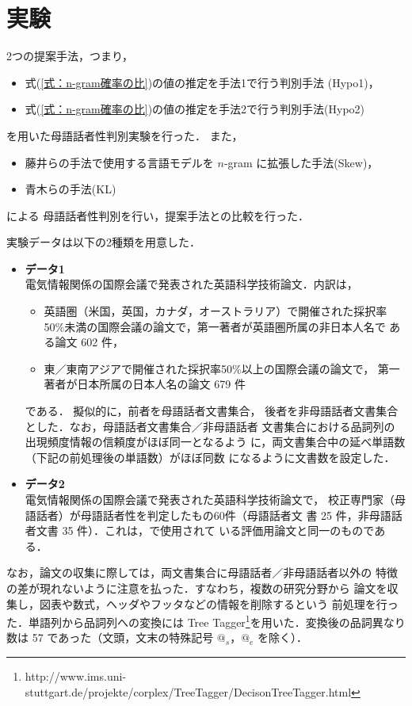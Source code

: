 \documentclass[japanese]{jnlp_1.4}
\begin{document}
\section{実験}

2つの提案手法，つまり，
\begin{itemize}
\item 式(\ref{式：n-gram確率の比})の値の推定を手法1で行う判別手法
	   (Hypo1)，
\item 式(\ref{式：n-gram確率の比})の値の推定を手法2で行う判別手法(Hypo2)
\end{itemize}
を用いた母語話者性判別実験を行った．
また，
\begin{itemize}
\item 藤井らの手法で使用する言語モデルを $n$-gram に拡張した手法(Skew)，
\item 青木らの手法(KL)
\end{itemize}
による
母語話者性判別を行い，提案手法との比較を行った．

実験データは以下の2種類を用意した．
\begin{itemize}
 \item {\bf データ1}\\
       電気情報関係の国際会議で発表された英語科学技術論文．内訳は，
       \begin{itemize}
	\item 英語圏（米国，英国，カナダ，オーストラリア）で開催された採択率
	      50\%未満の国際会議の論文で，第一著者が英語圏所属の非日本人名で
	      ある論文 602 件，
	\item 東／東南アジアで開催された採択率50\%以上の国際会議の論文で，
	      第一著者が日本所属の日本人名の論文 679 件
       \end{itemize} 
       である．
       擬似的に，前者を母語話者文書集合，
       後者を非母語話者文書集合とした．なお，母語話者文書集合／非母語話者
       文書集合における品詞列の出現頻度情報の信頼度がほぼ同一となるよう
       に，両文書集合中の延べ単語数（下記の前処理後の単語数）がほぼ同数
       になるように文書数を設定した．
 \item {\bf データ2}\\
       電気情報関係の国際会議で発表された英語科学技術論文で，
       校正専門家（母語話者）が母語話者性を判定したもの60件（母語話者文
       書 25 件，非母語話者文書 35 件）．これは，\cite{青木}で使用されて
       いる評価用論文と同一のものである．
\end{itemize}

なお，論文の収集に際しては，両文書集合に母語話者／非母語話者以外の
特徴の差が現れないように注意を払った．すなわち，複数の研究分野から
論文を収集し，図表や数式，ヘッダやフッタなどの情報を削除するという
前処理を行った．単語列から品詞列への変換には Tree Tagger\footnote{
http://www.ims.uni-stuttgart.de/projekte/corplex/TreeTagger/DecisonTreeTagger.html
}を用いた．変換後の品詞異なり数は 57 であった（文頭，文末の特殊記号
$@_s$，$@_e$ を除く）．
\end{document}
